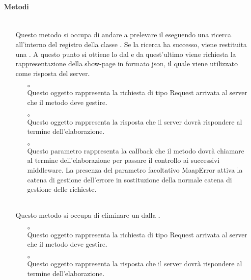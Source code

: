 \paragraph*{Metodi}
\begin{itemize}
\item[]  \\ Questo metodo si occupa di andare a prelevare il  eseguendo una ricerca all'interno del registro della classe . Se la ricerca ha successo, viene restituita una . A questo punto si ottiene lo  dal  e da quest'ultimo viene richiesta la rappresentazione della show-page in formato json, il quale viene utilizzato come risposta del server.
\begin{itemize}\addtolength{\itemsep}{-0.5\baselineskip}
\item[$\circ$]  \\ Questo oggetto rappresenta la richiesta di tipo Request arrivata al server che il metodo deve gestire.
\item[$\circ$]  \\ Questo oggetto rappresenta la risposta che il server dovrà rispondere al termine dell'elaborazione.
\item[$\circ$]  \\ Questo parametro rappresenta la callback che il metodo dovrà chiamare al termine dell'elaborazione per passare il controllo ai successivi middleware. La presenza del parametro facoltativo MaapError attiva la catena di gestione dell'errore in sostituzione della normale catena di gestione delle richieste.
\end{itemize}
\item[]  \\ Questo metodo si occupa di eliminare un  dalla .
\begin{itemize}\addtolength{\itemsep}{-0.5\baselineskip}
\item[$\circ$]  \\ Questo oggetto rappresenta la richiesta di tipo Request arrivata al server che il metodo deve gestire.
\item[$\circ$]  \\ Questo oggetto rappresenta la risposta che il server dovrà rispondere al termine dell'elaborazione.

\end{itemize}
\end{itemize}
